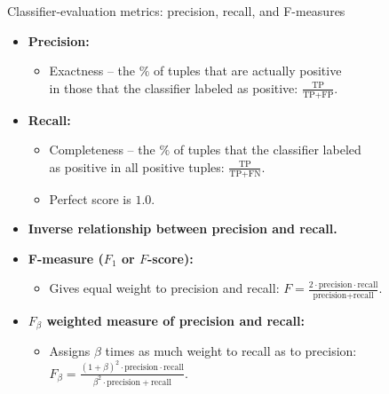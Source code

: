 \documentclass[aspectratio=169,t,table]{beamer}
\begin{document}
  {
    \begin{frame}{Classifier-evaluation metrics: precision, recall, and F-measures}
      \begin{itemize}
        \item \textbf{Precision:}
        \begin{itemize}
          \item Exactness -- the $\%$ of tuples that are actually positive \\
          in those that the classifier labeled as positive: $\frac{\text{TP}}{\text{TP} + \text{FP}}$.
        \end{itemize}
        \item \textbf{Recall:}
        \begin{itemize}
          \item Completeness -- the $\%$ of tuples that the classifier labeled \\
          as positive in all positive tuples: $\frac{\text{TP}}{\text{TP} + \text{FN}}$.
          \item Perfect score is $1.0$.
        \end{itemize}
        \item \textbf{Inverse relationship between precision and recall.}
        \item \textbf{F-measure ($F_1$ or $F$-score):}
        \begin{itemize}
          \item Gives equal weight to precision and recall: $F = \frac{2\cdot\text{precision}\cdot \text{recall}}{\text{precision} + \text{recall}}$.
        \end{itemize}
        \item \textbf{$F_\beta$ weighted measure of precision and recall:}
        \begin{itemize}
          \item Assigns $\beta$ times as much weight to recall as to precision: $F_\beta = \frac{(1+\beta)^2 \cdot \text{precision} \cdot \text{recall}}{\beta^2 \cdot \text{precision} + \text{recall}}$.
        \end{itemize}
      \end{itemize}
    \end{frame}
  }
\end{document}
